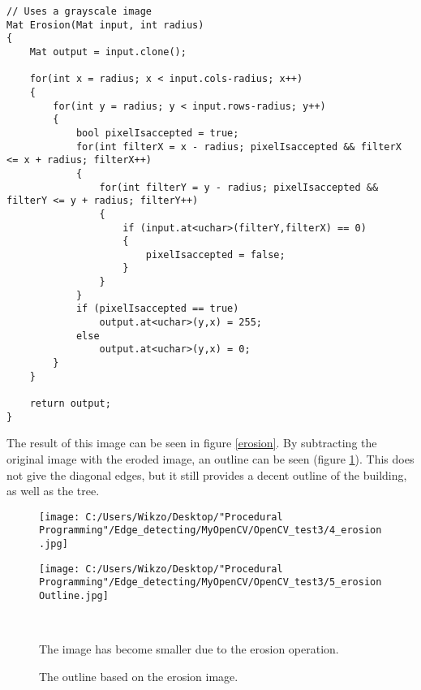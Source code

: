 \begin{lstlisting}
// Uses a grayscale image
Mat Erosion(Mat input, int radius)
{
	Mat output = input.clone();

	for(int x = radius; x < input.cols-radius; x++)
	{
		for(int y = radius; y < input.rows-radius; y++)
		{
			bool pixelIsaccepted = true;
			for(int filterX = x - radius; pixelIsaccepted && filterX <= x + radius; filterX++)
			{
				for(int filterY = y - radius; pixelIsaccepted && filterY <= y + radius; filterY++)
				{
					if (input.at<uchar>(filterY,filterX) == 0)
					{
						pixelIsaccepted = false;
					}
				}
			}
			if (pixelIsaccepted == true)
				output.at<uchar>(y,x) = 255;
			else
				output.at<uchar>(y,x) = 0;
		}
	}

	return output;
}
\end{lstlisting}

The result of this image can be seen in figure \ref{erosion}. By subtracting the original image with the eroded image, an outline can be seen (figure \ref{erosionOutline}). This does not give the diagonal edges, but it still provides a decent outline of the building, as well as the tree.

\begin{figure}[H]\centering
	\begin{minipage}[b]{0.48\textwidth}\centering
		\texttt{[image: C:/Users/Wikzo/Desktop/"Procedural Programming"/Edge\_detecting/MyOpenCV/OpenCV\_test3/4\_erosion.jpg]} %
	\end{minipage}\hfill
	\begin{minipage}[b]{0.48\textwidth}\centering
		\texttt{[image: C:/Users/Wikzo/Desktop/"Procedural Programming"/Edge\_detecting/MyOpenCV/OpenCV\_test3/5\_erosionOutline.jpg]} %
	\end{minipage}\\ %
	\begin{minipage}[t]{0.48\textwidth}
		\caption{The image has become smaller due to the erosion operation.} %
		\label{erosion}
	\end{minipage}\hfill
	\begin{minipage}[t]{0.48\textwidth}
		\caption{The outline based on the erosion image.} %
		\label{erosionOutline}
	\end{minipage}
\end{figure}

